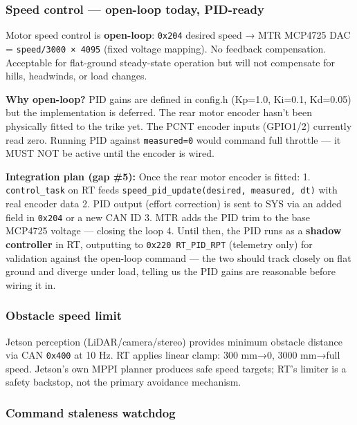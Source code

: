 \subsubsection{Speed control --- open-loop today,
PID-ready}\label{speed-control-open-loop-today-pid-ready}

Motor speed control is \textbf{open-loop}: \texttt{0x204} desired speed → MTR
MCP4725 DAC = \texttt{speed/3000\ ×\ 4095} (fixed voltage mapping). No feedback
compensation. Acceptable for flat-ground steady-state operation but will not
compensate for hills, headwinds, or load changes.

\textbf{Why open-loop?} PID gains are defined in config.h (Kp=1.0, Ki=0.1,
Kd=0.05) but the implementation is deferred. The rear motor encoder hasn't been
physically fitted to the trike yet. The PCNT encoder inputs (GPIO1/2) currently
read zero. Running PID against \texttt{measured=0} would command full throttle
--- it MUST NOT be active until the encoder is wired.

\textbf{Integration plan (gap \#5):} Once the rear motor encoder is fitted: 1.
\texttt{control\_task} on RT feeds
\texttt{speed\_pid\_update(desired,\ measured,\ dt)} with real encoder data 2.
PID output (effort correction) is sent to SYS via an added field in
\texttt{0x204} or a new CAN ID 3. MTR adds the PID trim to the base MCP4725
voltage --- closing the loop 4. Until then, the PID runs as a \textbf{shadow
controller} in RT, outputting to \texttt{0x220\ RT\_PID\_RPT} (telemetry only)
for validation against the open-loop command --- the two should track closely on
flat ground and diverge under load, telling us the PID gains are reasonable
before wiring it in.

\subsubsection{Obstacle speed limit}\label{obstacle-speed-limit}

Jetson perception (LiDAR/camera/stereo) provides minimum obstacle distance via
CAN \texttt{0x400} at 10 Hz. RT applies linear clamp: 300 mm→0, 3000 mm→full
speed. Jetson's own MPPI planner produces safe speed targets; RT's limiter is a
safety backstop, not the primary avoidance mechanism.

\subsubsection{Command staleness watchdog}\label{command-staleness-watchdog}


